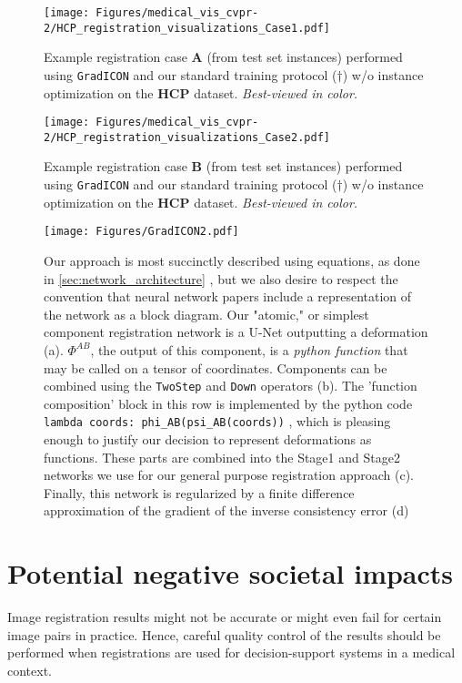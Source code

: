 \begin{figure*}
	\texttt{[image: Figures/medical\_vis\_cvpr-2/HCP\_registration\_visualizations\_Case1.pdf]}
	\caption{\label{Fig:brain_example_case1} Example registration case \textbf{A} (from test set instances) performed using \texttt{GradICON} and our standard training protocol ($\dagger$) w/o instance optimization on the \textbf{HCP} dataset. \emph{Best-viewed in color.}}
\end{figure*}
\begin{figure*}
	\texttt{[image: Figures/medical\_vis\_cvpr-2/HCP\_registration\_visualizations\_Case2.pdf]}
	\caption{\label{Fig:brain_example_case2} Example registration case \textbf{B} (from test set instances) performed using \texttt{GradICON} and our standard training protocol ($\dagger$) w/o instance optimization on the \textbf{HCP} dataset. \emph{Best-viewed in color.}}
\end{figure*}

\begin{figure*}
\centering
    \texttt{[image: Figures/GradICON2.pdf]}
    \caption{Our approach is most succinctly described using equations, as done in \ref{sec:network_architecture}
, but we also desire to respect the convention that neural network papers include a representation of the network as a block diagram. Our "atomic," or simplest component registration network is a U-Net outputting a deformation (a). $\Phi^{AB}$, the output of this component, is a \emph{python function} that may be called on a tensor of coordinates. Components can be combined using the \texttt{TwoStep} and \texttt{Down} operators (b). The 'function composition' block in this row is implemented by the python code \texttt{lambda coords: phi\_AB(psi\_AB(coords))} , which is pleasing enough to justify our decision to represent deformations as functions. These parts are combined into the Stage1 and Stage2 networks we use for our general purpose registration approach (c). Finally, this network is regularized by a finite difference approximation of the gradient of the inverse consistency error (d)}
\label{Fig:network_block_diagram}
\end{figure*}
\section{Potential negative societal impacts}
\label{Sec:social_impact}
Image registration results might not be accurate or might even fail for certain image pairs in practice. Hence, careful quality control of the results should be performed when registrations are used for decision-support systems in a medical context.
